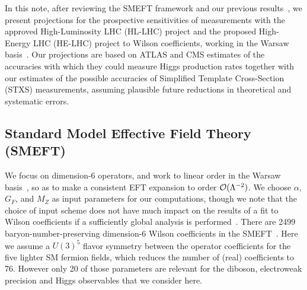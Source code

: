 \documentclass[../report.tex]{subfiles}
\begin{document}
In this note, after reviewing the SMEFT framework and our previous results~\cite{Ellis:2018gqa}, we present projections for the
prospective sensitivities of measurements with the approved High-Luminosity LHC (HL-LHC) project and the proposed High-Energy LHC (HE-LHC) project
to Wilson coefficients, working in the Warsaw basis~\cite{Grzadkowski:2010es}. 
Our projections are based on ATLAS and CMS estimates of the accuracies with which they
could measure Higgs production rates together with our estimates of the possible accuracies of Simplified Template Cross-Section (STXS)
measurements, assuming plausible future reductions in theoretical and systematic errors.

\subsection{Standard Model Effective Field Theory (SMEFT)}
\label{sec8:smeft}
We focus on dimension-6 operators, and work to linear order in the Warsaw basis~\cite{Grzadkowski:2010es},
so as to make a consistent EFT expansion to order ${\cal O}(\Lambda^{-2})$. 
We choose $\alpha$, $G_F$, and $M_Z$ as input parameters for our computations, though we note that
the choice of input scheme does not have much impact on the results of a fit to Wilson coefficients if a sufficiently global analysis is performed~\cite{Brivio:2017bnu}.
There are 2499 baryon-number-preserving dimension-6 Wilson coefficients in the SMEFT~\cite{Alonso:2013hga}.
Here we assume a $U(3)^5$ flavor symmetry between the operator coefficients for the five lighter SM fermion fields,
which reduces the number of (real) coefficients to 76.
However only 20 of those parameters are relevant for the diboson, electroweak precision and Higgs observables that we consider here.
\end{document}
